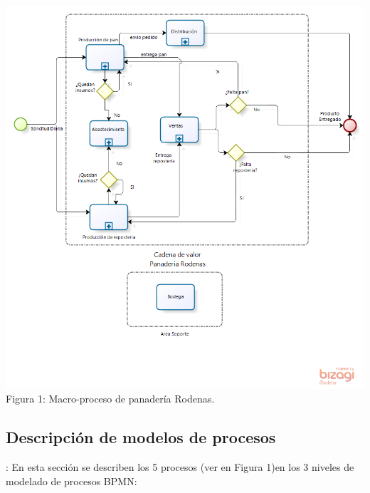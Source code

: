 \begin{center}
\includegraphics[width=15cm]{./imagenes/Macro_proceso.png}\\
Figura 1: Macro-proceso de panadería Rodenas.
\end{center}
\newpage
\subsection{Descripción de modelos de procesos} : En esta sección se describen los 5 procesos (ver en Figura 1)en los 3 niveles de modelado de procesos BPMN:

